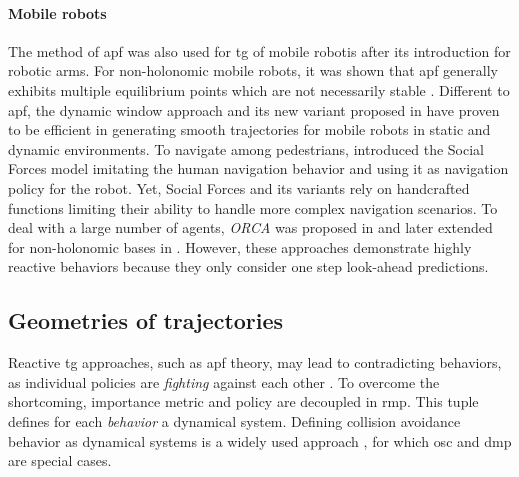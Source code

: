 \paragraph{Mobile robots}

The method of \ac{apf} was also used for \ac{tg} of mobile
robotis after its introduction for robotic arms.
For non-holonomic mobile robots, it was shown that \ac{apf}
generally exhibits multiple equilibrium points which are not
necessarily stable \cite{urakubo2018stability}.
Different to \ac{apf}, the dynamic window approach
\cite{Fox1997} and its new variant proposed in
\cite{Zhang2019} have proven to be efficient in generating
smooth trajectories for mobile robots in static and dynamic
environments. To navigate among pedestrians,
\cite{Ferrer2013} introduced the Social Forces model
imitating the human navigation behavior and using it as
navigation policy for the robot.  Yet, Social Forces and its
variants rely on handcrafted functions limiting their
ability to handle more complex navigation scenarios. To deal
with a large number of agents, \textit{ORCA} was proposed in
\cite{VanDenBerg2011} and later extended for non-holonomic
bases in \cite{Alonso-Mora2012a}. However, these approaches
demonstrate highly reactive behaviors because they only
consider one step look-ahead predictions.



%

\subsection{Geometries of trajectories}
\label{sec:geometries_of_trajectories}

Reactive \ac{tg} approaches, such as \ac{apf} theory,
may lead to contradicting behaviors, as individual policies
are \textit{fighting} against each other \cite{Ratliff2018}.
To overcome the shortcoming, importance metric and policy
are decoupled in \ac{rmp}. This tuple defines
for each \textit{behavior} a dynamical system.
Defining collision avoidance behavior as dynamical systems
is a widely used approach
\cite{khansari2012dynamical,huber2023avoidance}, for which
\ac{osc} \cite{Khatib1987a} and \ac{dmp}
\cite{ijspeert2013dynamical} are special cases.

